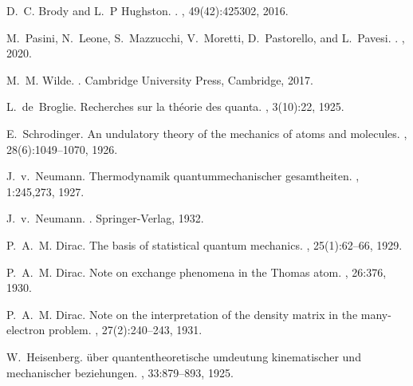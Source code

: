 \documentclass[nofootinbib,pre,twocolumn,showpacs,showkeys,groupaddress,preprintnumbers,floatfix]{revtex4-1}
\newcommand{\1}{\mathbbm{1}}
\begin{document}
\begin{thebibliography}{10}
D.~C. Brody and L.~P Hughston.
.
, 49(42):425302, 2016.

M.~Pasini, N.~Leone, S.~Mazzucchi, V.~Moretti, D.~Pastorello, and L.~Pavesi.
.
, 2020.

M.~M. Wilde.
.
\newblock Cambridge University Press, Cambridge, 2017.

L.~de~Broglie.
\newblock Recherches sur la th\'eorie des quanta.
, 3(10):22, 1925.

E.~Schrodinger.
\newblock An undulatory theory of the mechanics of atoms and molecules.
, 28(6):1049--1070, 1926.

J.~v.~Neumann.
\newblock Thermodynamik quantummechanischer gesamtheiten.
, 1:245,273, 1927.

J.~v.~Neumann.
.
\newblock Springer-Verlag, 1932.

P.~A.~M. Dirac.
\newblock The basis of statistical quantum mechanics.
, 25(1):62--66, 1929.

P.~A.~M. Dirac.
\newblock Note on exchange phenomena in the {Thomas} atom.
, 26:376, 1930.

P.~A.~M. Dirac.
\newblock Note on the interpretation of the density matrix in the many-electron
  problem.
, 27(2):240--243, 1931.

W.~Heisenberg.
\newblock \"uber quantentheoretische umdeutung kinematischer und mechanischer
  beziehungen.
, 33:879--893, 1925.

\end{thebibliography}

\makeatletter
\newcommand{\manuallabel}[2]{\def\@currentlabel{#2}\label{#1}}
\makeatother

\clearpage
\appendix
\onecolumngrid

\pagestyle{empty}
\end{document}
